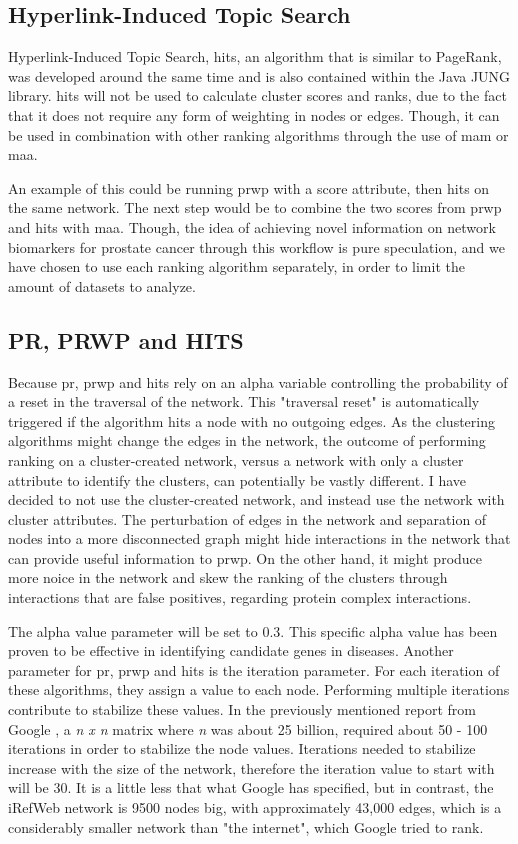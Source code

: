 \subsection{Hyperlink-Induced Topic Search}
Hyperlink-Induced Topic Search, \gls{hits}, an algorithm that is similar to
PageRank, was developed around the same time \cite{hits}\cite{hits-origin} and
is also contained within the Java JUNG library. \gls{hits} will not be used to
calculate cluster scores and ranks, due to the fact that it does not require any
form of weighting in nodes or edges. Though, it can be used in combination with
other ranking algorithms through the use of \gls{mam} or \gls{maa}. 

An example of this could be running \gls{prwp} with a score attribute, then
\gls{hits} on the same network. The next step would be to combine the two scores
from \gls{prwp} and \gls{hits} with \gls{maa}. Though, the idea of achieving
novel information on network biomarkers for prostate cancer through this
workflow is pure speculation, and we have chosen to use each ranking algorithm
separately, in order to limit the amount of datasets to analyze.

\subsection{PR, PRWP and HITS}
Because \gls{pr}, \gls{prwp} and \gls{hits} rely on an alpha variable
controlling the probability of a reset in the traversal of the network. This
"traversal reset" is automatically triggered if the algorithm hits a node with
no outgoing edges. As the clustering algorithms might change the edges in the
network, the outcome of performing ranking on a cluster-created network, versus
a network with only a cluster attribute to identify the clusters, can
potentially be vastly different. I have decided to not use the cluster-created
network, and instead use the network with cluster attributes. The perturbation
of edges in the network and separation of nodes into a more disconnected graph
might hide interactions in the network that can provide useful information to
\gls{prwp}. On the other hand, it might produce more noice in the network and
skew the ranking of the clusters through interactions that are false positives,
regarding protein complex interactions. 

The alpha value parameter will be set to 0.3. This specific alpha value has been
proven to be effective in identifying candidate genes in
diseases\cite{disease-prwp}. Another parameter for \gls{pr}, \gls{prwp} and
\gls{hits} is the iteration parameter. For each iteration of these algorithms,
they assign a value to each node. Performing multiple iterations contribute to
stabilize these values. In the previously mentioned report from Google
\cite{pr-parameters}, a \textit{n x n} matrix where \textit{n} was about 25
billion, required about 50 - 100 iterations in order to stabilize the node
values. Iterations needed to stabilize increase with the size of the network,
therefore the iteration value to start with will be 30. It is a little less that
what Google has specified, but in contrast, the iRefWeb network is 9500 nodes
big, with approximately 43,000 edges, which is a considerably smaller network
than "the internet", which Google tried to rank.

